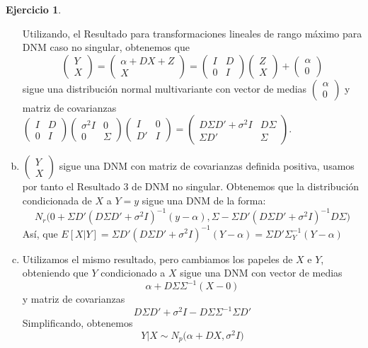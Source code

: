 \documentclass[12pt,spanish]{article}
\theoremstyle{definition}
\newtheorem{exercise}{Ejercicio}
\begin{document}
\begin{exercise}
\begin{enumerate}[a)]
    Utilizando, el Resultado para transformaciones lineales de rango
    máximo para DNM caso no singular, obtenemos que
    \[
      \begin{pmatrix}
        Y \\ X
      \end{pmatrix}=
      \begin{pmatrix}
        \alpha+DX+Z \\ X
      \end{pmatrix}=
      \begin{pmatrix}
        I & D \\ 0 & I
      \end{pmatrix}
      \begin{pmatrix}
        Z \\ X
      \end{pmatrix}+
      \begin{pmatrix}
        \alpha \\ 0
      \end{pmatrix}
    \]
    sigue una distribución normal multivariante con vector de medias $
    \begin{pmatrix}
      \alpha \\ 0
    \end{pmatrix}$ y matriz de covarianzas $
    \begin{pmatrix}
      I & D \\ 0 & I
    \end{pmatrix}\begin{pmatrix}
      \sigma^2I & 0 \\ 0 & \Sigma
    \end{pmatrix}\begin{pmatrix}
      I & 0 \\ D' & I
    \end{pmatrix}=
    \begin{pmatrix}
      D\Sigma D'+\sigma^2I & D\Sigma \\ \Sigma D' & \Sigma
    \end{pmatrix}$.
  \item $\begin{pmatrix}
        Y \\ X
      \end{pmatrix}$ sigue una DNM con matriz de covarianzas definida
      positiva, usamos por tanto el Resultado 3 de DNM no
      singular. Obtenemos que la distribución condicionada de $X$ a
      $Y=y$ sigue una DNM de la forma:
      \[N_r\Big(0+\Sigma D'(D\Sigma
        D'+\sigma^2I)^{-1}(y-\alpha),\Sigma-\Sigma D'(D\Sigma
        D'+\sigma^2I)^{-1}D\Sigma\Big)\] Así, que
      $E[X|Y]=\Sigma D'(D\Sigma D'+\sigma^2I)^{-1}(Y-\alpha)=\Sigma D'\Sigma_Y^{-1}(Y-\alpha)$
    \item Utilizamos el mismo resultado, pero cambiamos los papeles de
      $X$ e $Y$, obteniendo que $Y$ condicionado a $X$ sigue una DNM
      con vector de medias
      \[\alpha+D\Sigma\Sigma^{-1}(X-0)\]
      y matriz de covarianzas
      \[D\Sigma D'+\sigma^2I-D\Sigma\Sigma^{-1}\Sigma D'\]
      Simplificando, obtenemos
      \[Y|X\sim N_p\Big(\alpha+D X,\sigma^2I\Big)\]
  \end{enumerate}
\end{exercise}
\end{document}
